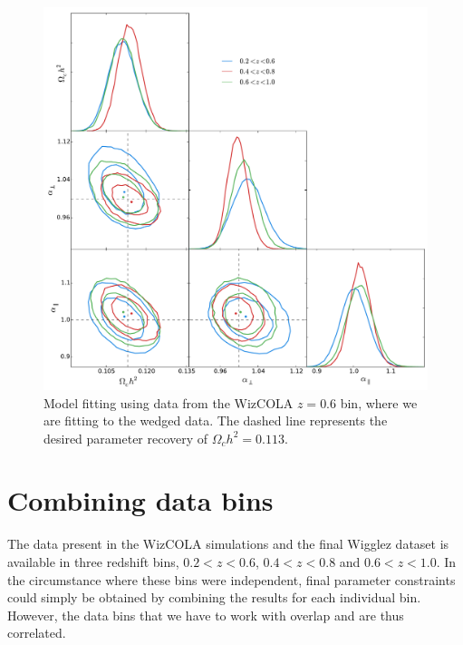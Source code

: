 \documentclass[titlesmallcaps, examinerscopy, copyrightpage]{uqthesis}
\begin{document}
\begin{figure}[h!]
  \begin{center}
    \includegraphics[width=\textwidth]{images/wizwedge.pdf}
  \end{center}
  \caption{Model fitting using data from the WizCOLA $z=0.6$ bin, where we are fitting to the wedged data. The dashed line represents the desired parameter recovery of $\Omega_c h^2 = 0.113$. }
  \label{fig:wizwedge}
\end{figure}











\newpage\phantom{blabla}\newpage
\section{Combining data bins}

The data present in the WizCOLA simulations and the final Wigglez dataset is available in three redshift bins, $0.2 < z < 0.6$, $0.4 < z < 0.8$ and $0.6 < z < 1.0$. In the circumstance where these bins were independent, final parameter constraints could simply be obtained by combining the results for each individual bin. However, the data bins that we have to work with overlap and are thus correlated. 
\end{document}
